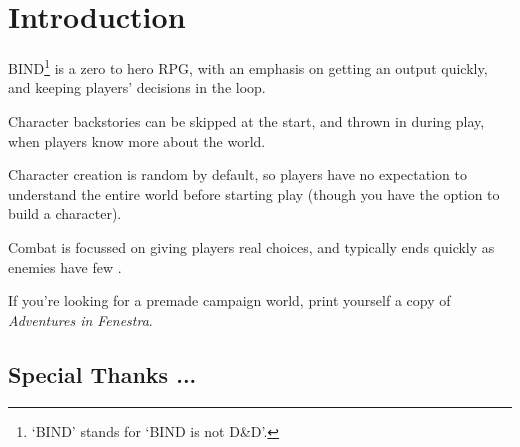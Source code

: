 \chapter*{Introduction}

\begin{multicols}{2}

BIND\footnote{`BIND' stands for `BIND is not D\&D'.} is a zero to hero RPG, with an emphasis on getting an output quickly, and keeping players' decisions in the loop.

Character backstories can be skipped at the start, and thrown in during play, when players know more about the world.

Character creation is random by default, so players have no expectation to understand the entire world before starting play (though you have the option to build a character).

Combat is focussed on giving players real choices, and typically ends quickly as enemies have few .

If you're looking for a premade campaign world, print yourself a copy of \textit{Adventures in Fenestra}.

\end{multicols}

\section*{Special Thanks ...}

